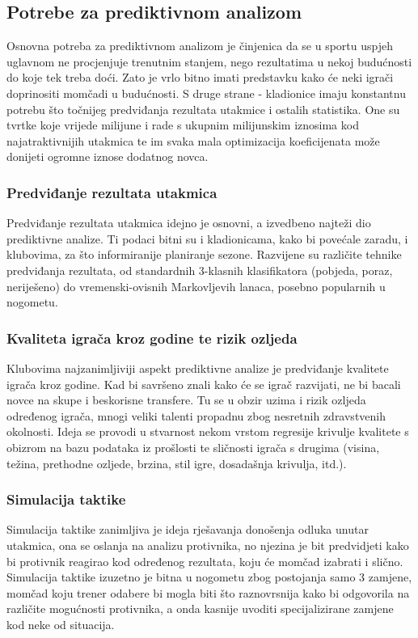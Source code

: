 \documentclass{ferseminar}
\begin{document}
\subsection{Potrebe za prediktivnom analizom}

Osnovna potreba za prediktivnom analizom je činjenica da se u sportu uspjeh uglavnom ne procjenjuje trenutnim stanjem, nego rezultatima u nekoj budućnosti do koje tek treba doći. Zato je vrlo bitno imati predstavku kako će neki igrači doprinositi momčadi u budućnosti.
\newline
S druge strane - kladionice imaju konstantnu potrebu što točnijeg predviđanja rezultata utakmice i ostalih statistika. One su tvrtke koje vrijede milijune i rade s ukupnim milijunskim iznosima kod najatraktivnijih utakmica te im svaka mala optimizacija koeficijenata može donijeti ogromne iznose dodatnog novca.

\subsubsection{Predviđanje rezultata utakmica}
Predviđanje rezultata utakmica idejno je osnovni, a izvedbeno najteži dio prediktivne analize. Ti podaci bitni su i kladionicama, kako bi povećale zaradu, i klubovima, za što informiranije planiranje sezone. Razvijene su različite tehnike predviđanja rezultata, od standardnih 3-klasnih klasifikatora (pobjeda, poraz, neriješeno) do vremenski-ovisnih Markovljevih lanaca, posebno popularnih u nogometu.

\subsubsection{Kvaliteta igrača kroz godine te rizik ozljeda}
Klubovima najzanimljiviji aspekt prediktivne analize je predviđanje kvalitete igrača kroz godine. Kad bi savršeno znali kako će se igrač razvijati, ne bi bacali novce na skupe i beskorisne transfere. Tu se u obzir uzima i rizik ozljeda određenog igrača, mnogi veliki talenti propadnu zbog nesretnih zdravstvenih okolnosti. Ideja se provodi u stvarnost nekom vrstom regresije krivulje kvalitete s obizrom na bazu podataka iz prošlosti te sličnosti igrača s drugima (visina, težina, prethodne ozljede, brzina, stil igre, dosadašnja krivulja, itd.).

\subsubsection{Simulacija taktike}
Simulacija taktike zanimljiva je ideja rješavanja donošenja odluka unutar utakmica, ona se oslanja na analizu protivnika, no njezina je bit predvidjeti kako bi protivnik reagirao kod određenog rezultata, koju će momčad izabrati i slično. Simulacija taktike izuzetno je bitna u nogometu zbog postojanja samo 3 zamjene, momčad koju trener odabere bi mogla biti što raznovrsnija kako bi odgovorila na različite mogućnosti protivnika, a onda kasnije uvoditi specijalizirane zamjene kod neke od situacija.
\end{document}

